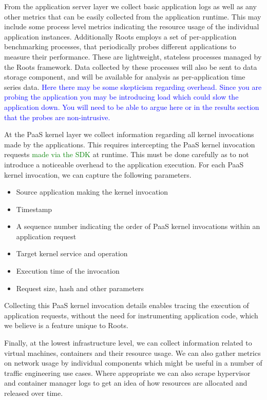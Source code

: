 From the application server layer we collect basic application logs as well as any other
metrics that can be easily collected from the application runtime. This may include some process level
metrics indicating the resource usage of the individual application instances. Additionally Roots
employs a set of per-application benchmarking processes, that periodically probes 
different applications
to measure their performance. These are lightweight, stateless processes managed by the Roots framework.
Data collected by these processes will also be sent to data storage component, and will be available
for analysis as per-application time series data.
\textcolor{blue}{Here there may be some skepticism regarding overhead.  Since
you are probing the application you may be introducing load which could slow
the application down.  You will need to be able to argue here or in the
results section that the probes are non-intrusive.}


At the PaaS kernel layer we collect information regarding all kernel invocations
made by the applications. This requires intercepting the PaaS kernel invocation
requests \textcolor{green}{made via the SDK} at runtime. This must be done carefully as to not introduce a noticeable
overhead to the application execution. For each PaaS kernel invocation, we can capture the 
following parameters.
\begin{itemize}
\item Source application making the kernel invocation
\item Timestamp
\item A sequence number indicating the order of PaaS kernel invocations within an application request
\item Target kernel service and operation
\item Execution time of the invocation
\item Request size, hash and other parameters
\end{itemize}
Collecting this PaaS kernel invocation details enables tracing the execution of application 
requests, without the need for instrumenting application code, which we believe is a feature 
unique to Roots. 

Finally, at the lowest infrastructure level, we can collect information related to virtual machines, containers
and their resource usage. We can also gather metrics on network usage by individual components which
might be useful in a number of traffic engineering use cases. Where appropriate we can also scrape
hypervisor and container manager logs to get an idea of how resources are allocated and released over
time.

